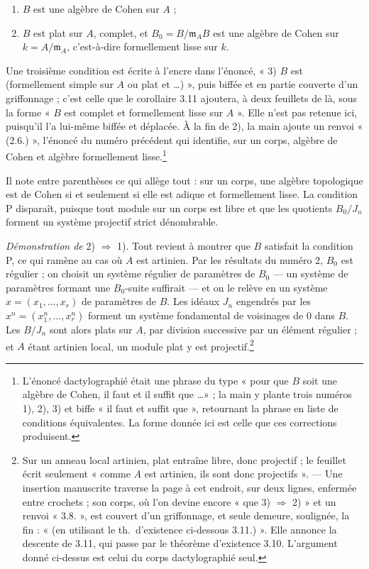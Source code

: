 \documentclass[11pt,a4paper]{article}
\begin{document}
\begin{enumerate}
  \item[1)] $B$ est une algèbre de Cohen sur $A$ ;
  \item[2)] $B$ est plat sur $A$, complet, et $B_0 = B/\mathfrak{m}_A B$ est
  une algèbre de Cohen sur $k = A/\mathfrak{m}_A$, c'est-à-dire formellement
  lisse sur $k$.
\end{enumerate}

Une troisième condition est écrite à l'encre dans l'énoncé, « 3) $B$ est
(formellement simple sur $A$ ou plat et \ldots) », puis biffée et en partie
couverte d'un griffonnage ; c'est celle que le corollaire 3.11 ajoutera, à deux
feuillets de là, sous la forme « $B$ est complet et formellement lisse sur
$A$ ». Elle n'est pas retenue ici, puisqu'il l'a lui-même biffée et
déplacée. À la fin de 2), la main ajoute un renvoi « (2.6.) », l'énoncé du
numéro précédent qui identifie, sur un corps, algèbre de Cohen et algèbre
formellement lisse.\footnote{L'énoncé dactylographié était une
phrase du type « pour que $B$ soit une algèbre de Cohen, il faut et il suffit
que \ldots » ; la main y plante trois numéros 1), 2), 3) et biffe « il faut et
suffit que », retournant la phrase en liste de conditions équivalentes. La
forme donnée ici est celle que ces corrections produisent.}

Il note entre parenthèses ce qui allège tout : sur un corps, une algèbre
topologique est de Cohen si et seulement si elle est adique et formellement
lisse. La condition P disparaît, puisque tout module sur un corps est libre et
que les quotients $B_0/J_n$ forment un système projectif strict dénombrable.

\emph{Démonstration de} 2) $\Rightarrow$ 1). Tout revient à montrer que $B$
satisfait la condition P, ce qui ramène au cas où $A$ est artinien. Par les
résultats du numéro 2, $B_0$ est régulier ; on choisit un système régulier de
paramètres de $B_0$ — un système de paramètres formant une $B_0$-suite
suffirait — et on le relève en un système $x = (x_1, \ldots, x_r)$ de
paramètres de $B$. Les idéaux $J_n$ engendrés par les $x^n = (x_1^n, \ldots,
x_r^n)$ forment un système fondamental de voisinages de $0$ dans $B$. Les
$B/J_n$ sont alors plats sur $A$, par division successive par un élément
régulier ; et $A$ étant artinien local, un module plat y est
projectif.\footnote{Sur un anneau local artinien, plat entraîne libre, donc
projectif ; le feuillet écrit seulement « comme $A$ est artinien, ils sont donc
projectifs ». — Une insertion manuscrite traverse la page à cet endroit, sur
deux lignes, enfermée entre crochets ; son corps, où l'on devine encore « que
3) $\Rightarrow$ 2) » et un renvoi « 3.8. », est couvert d'un griffonnage, et
seule demeure, soulignée, la fin : « (en utilisant le th.\ d'existence
ci-dessous 3.11.) ». Elle annonce la descente de 3.11, qui passe par le
théorème d'existence 3.10. L'argument donné ci-dessus est celui du corps
dactylographié seul.}
\end{document}
